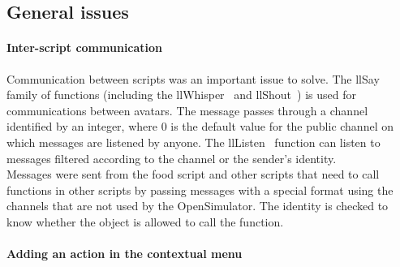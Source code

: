 {\begin{itemize}
\begin{itemize}
\subsection{General issues}



\paragraph{Inter-script communication} 
\label{llsayCom}
Communication between scripts was an important issue to solve. 
The llSay ~\cite{URLsay} family of functions (including the llWhisper~\cite{URLwh} and llShout~\cite{URLShout}) is used for communications between avatars. The message passes through a channel identified by an integer, where 0 is the default value for the public channel on which messages are listened by anyone. The llListen~\cite{URLsay} function can listen to messages filtered according to the channel or the sender's identity. 
\\Messages were sent from the food script and other scripts that need to call functions in other scripts by passing messages with a special format using the channels that are not used by the OpenSimulator. The identity is checked to know whether the object is allowed to call the function.


\paragraph{Adding an action in the contextual menu}
\label{sec:setsittext}


\end{itemize}
\end{itemize}}
